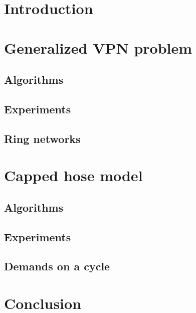 \documentclass[11pt]{article}
\begin{document}
    \section{Introduction}
        
    \section{Generalized VPN problem}

    \subsection{Algorithms}

    \subsection{Experiments}

    \subsection{Ring networks}
    
    \section{Capped hose model}

    \subsection{Algorithms}

    \subsection{Experiments}

    \subsection{Demands on a cycle}

    \section{Conclusion}
\end{document}
